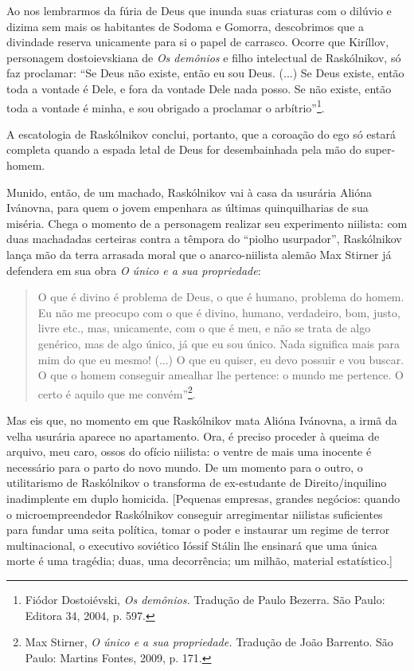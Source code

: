 Ao nos lembrarmos da fúria de Deus que inunda suas criaturas com o
dilúvio e dizima sem mais os habitantes de Sodoma e Gomorra, descobrimos
que a divindade reserva unicamente para si o papel de carrasco. Ocorre
que Kiríllov, personagem dostoievskiana de \emph{Os demônios} e filho
intelectual de Raskólnikov, só faz proclamar: ``Se Deus não existe,
então eu sou Deus. (...) Se Deus existe, então toda a vontade é Dele, e
fora da vontade Dele nada posso. Se não existe, então toda a vontade é
minha, e sou obrigado a proclamar o arbítrio''\footnote{Fiódor
  Dostoiévski, \emph{Os demônios.} Tradução de Paulo Bezerra. São Paulo:
  Editora 34, 2004, p. 597.}.

A escatologia de Raskólnikov conclui, portanto, que a coroação do ego só
estará completa quando a espada letal de Deus for desembainhada pela mão
do super-homem.

Munido, então, de um machado, Raskólnikov vai à casa da usurária Alióna
Ivánovna, para quem o jovem empenhara as últimas quinquilharias de sua
miséria. Chega o momento de a personagem realizar seu experimento
niilista: com duas machadadas certeiras contra a têmpora do ``piolho
usurpador'', Raskólnikov lança mão da terra arrasada moral que o
anarco-niilista alemão Max Stirner já defendera em sua obra \emph{O
único e a sua propriedade}:

\begin{quote}
O que é divino é problema de Deus, o que é humano, problema do homem. Eu
não me preocupo com o que é divino, humano, verdadeiro, bom, justo,
livre etc., mas, unicamente, com o que é meu, e não se trata de algo
genérico, mas de algo único, já que eu sou único. Nada significa mais
para mim do que eu mesmo! (...) O que eu quiser, eu devo possuir e vou
buscar. O que o homem conseguir amealhar lhe pertence: o mundo me
pertence. O certo é aquilo que me convém''\footnote{Max Stirner, \emph{O
  único e a sua propriedade.} Tradução de João Barrento. São Paulo:
  Martins Fontes, 2009, p. 171.}.
\end{quote}

Mas eis que, no momento em que Raskólnikov mata Alióna Ivánovna, a irmã
da velha usurária aparece no apartamento. Ora, é preciso proceder à
queima de arquivo, meu caro, ossos do ofício niilista: o ventre de mais
uma inocente é necessário para o parto do novo mundo. De um momento para
o outro, o utilitarismo de Raskólnikov o transforma de ex-estudante de
Direito/inquilino inadimplente em duplo homicida. {[}Pequenas empresas,
grandes negócios: quando o microempreendedor Raskólnikov conseguir
arregimentar niilistas suficientes para fundar uma seita política, tomar
o poder e instaurar um regime de terror multinacional, o executivo
soviético Ióssif Stálin lhe ensinará que uma única morte é uma tragédia;
duas, uma decorrência; um milhão, material estatístico.{]}

